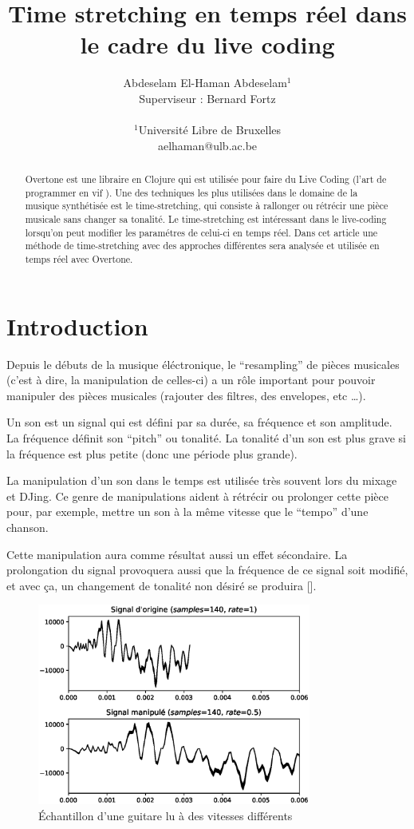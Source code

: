 \documentclass[letterpaper]{article}
\title{Time stretching en temps réel dans le cadre du live coding}
\author{Abdeselam El-Haman Abdeselam$^{1}$\\
Superviseur : Bernard Fortz
\mbox{}\\\\
$^1$Université Libre de Bruxelles \\
aelhaman@ulb.ac.be}
\begin{document}
\maketitle

\begin{abstract}
  Overtone est une libraire en Clojure qui est utilisée pour faire du
  Live Coding (l'art de programmer en \og vif \fg{}). Une des techniques les
  plus utilisées dans le domaine de la musique synthétisée est le
  time-stretching, qui consiste à rallonger ou rétrécir une pièce musicale
  sans changer sa tonalité. Le time-stretching est intéressant dans
  le live-coding lorsqu'on peut modifier les paramétres de celui-ci
  en temps réel. Dans cet article une méthode de time-stretching avec des
  approches différentes sera analysée et utilisée en temps
  réel avec Overtone.

\end{abstract}

\section{Introduction}

  Depuis le débuts de la musique éléctronique, le ``resampling'' de pièces musicales
  (c'est à dire, la manipulation de celles-ci) a un rôle important pour pouvoir manipuler
  des pièces musicales (rajouter des filtres, des envelopes, etc \ldots ).

  Un son est un signal qui est défini par sa durée, sa fréquence et son amplitude. La fréquence
  définit son ``pitch'' ou tonalité. La tonalité d'un son est plus grave si la fréquence est plus
  petite (donc une période plus grande).
  
  La manipulation d'un son dans le temps est utilisée très souvent lors du mixage et DJing.
  Ce genre de manipulations aident à rétrécir ou prolonger cette pièce pour, par exemple, mettre
  un son à la même vitesse que le ``tempo'' d'une chanson.

  Cette manipulation aura comme résultat aussi un effet sécondaire. La prolongation du signal
  provoquera aussi que la fréquence de ce signal soit modifié, et avec ça, un changement
  de tonalité non désiré se produira [\cite{RESAMPLING}].

  \begin{figure}[h]
    \centerline{\includegraphics[width=9cm]{res/fig1.eps}}
    \caption{\label{fig:guitar-stretch}Échantillon d'une guitare lu à des vitesses différents}
  \end{figure}
  
\end{document}
